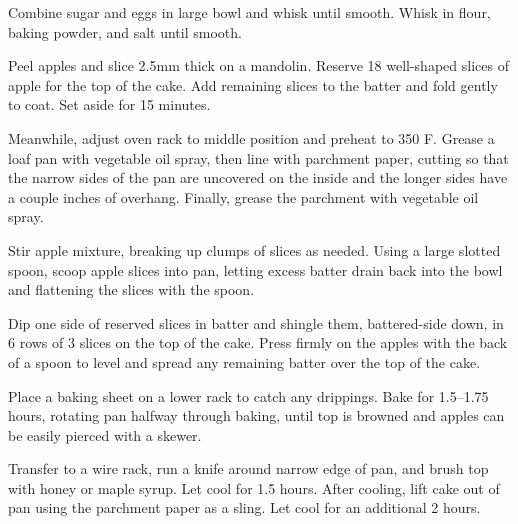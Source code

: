 \documentclass[oneside]{book}  %
\newcommand{\degF}{\textdegree F\xspace}
\begin{document}
\begin{directions}
  \item Combine sugar and eggs in large bowl and whisk until smooth. Whisk in
    flour, baking powder, and salt until smooth.

  \item Peel apples and slice 2.5mm thick on a mandolin. Reserve 18 well-shaped
    slices of apple for the top of the cake. Add remaining slices to the batter
    and fold gently to coat. Set aside for 15 minutes.

  \item Meanwhile, adjust oven rack to middle position and preheat to 350 \degF.
    Grease a loaf pan with vegetable oil spray, then line with parchment paper,
    cutting so that the narrow sides of the pan are uncovered on the inside and
    the longer sides have a couple inches of overhang. Finally, grease the
    parchment with vegetable oil spray.

  \item Stir apple mixture, breaking up clumps of slices as needed. Using a
    large slotted spoon, scoop apple slices into pan, letting excess batter
    drain back into the bowl and flattening the slices with the spoon.

  \item Dip one side of reserved slices in batter and shingle them,
    battered-side down, in 6 rows of 3 slices on the top of the cake. Press
    firmly on the apples with the back of a spoon to level and spread any
    remaining batter over the top of the cake.

  \item Place a baking sheet on a lower rack to catch any drippings.
    Bake for 1.5--1.75 hours, rotating pan halfway through baking, until top
    is browned and apples can be easily pierced with a skewer.

  \item Transfer to a wire rack, run a knife around narrow edge of pan, and
    brush top with honey or maple syrup. Let cool for 1.5 hours. After cooling,
    lift cake out of pan using the parchment paper as a sling. Let cool for an
    additional 2 hours.
\end{directions}
\end{document}
